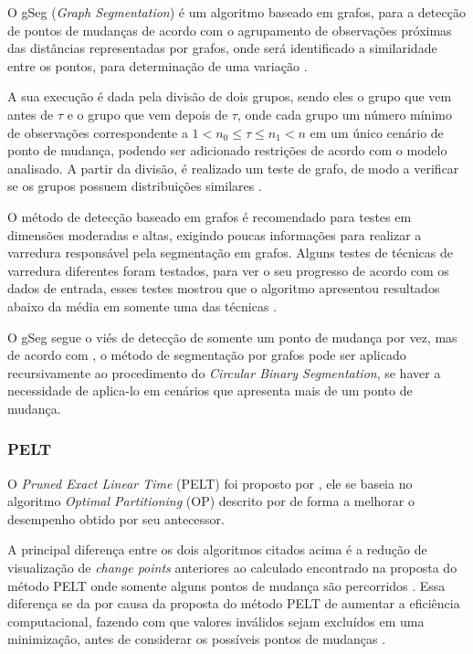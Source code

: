 O gSeg (\textit{Graph Segmentation}) é um algoritmo baseado em grafos, para a detecção de pontos de mudanças de acordo com o agrupamento de observações próximas das distâncias representadas por grafos, onde será identificado a similaridade entre os pontos, para determinação de uma variação
\cite{Chen2015}.

A sua execução é dada pela divisão de dois grupos, sendo eles o grupo que vem antes de $\tau$ e o grupo que vem depois de $\tau$, onde cada grupo um número mínimo de observações correspondente a $1 < n_{0} \leq \tau \leq n_{1} < n$ em um único cenário de ponto de mudança, podendo ser adicionado restrições de acordo com o modelo analisado. A partir da divisão, é realizado um teste de grafo, de modo a verificar se os grupos possuem distribuições similares \cite{Chen2015}.

O método de detecção baseado em grafos é recomendado para testes em dimensões moderadas e altas, exigindo poucas informações para realizar a varredura responsável pela segmentação em grafos. Alguns testes de técnicas de varredura diferentes foram testados, para ver o seu progresso de acordo com os dados de entrada, esses testes mostrou que o algoritmo apresentou resultados abaixo da média em somente uma das técnicas \cite{Chen2015}.

O gSeg segue o viés de detecção de somente um ponto de mudança por vez, mas de acordo com \cite{Chen2015}, o método de segmentação por grafos pode ser aplicado recursivamente ao procedimento do \textit{Circular Binary Segmentation}, se haver a necessidade de aplica-lo em cenários que apresenta mais de um ponto de mudança.


\subsubsection{PELT}

O \textit{Pruned Exact Linear Time} (PELT) foi proposto por \cite{Killick2012}, ele se baseia no algoritmo \textit{Optimal Partitioning} (OP) descrito por \cite{Gioumousis2005} de forma a melhorar o desempenho obtido por seu antecessor.

A principal diferença entre os dois algoritmos citados acima é a redução de visualização de \textit{change points} anteriores ao calculado encontrado na proposta do método PELT onde somente alguns pontos de mudança são percorridos \cite{BenedicteBakka2018}. Essa diferença se da por causa da proposta do método PELT de aumentar a eficiência computacional, fazendo com que valores inválidos sejam excluídos em uma minimização, antes de considerar os possíveis pontos de mudanças \cite{Killick2012}.

